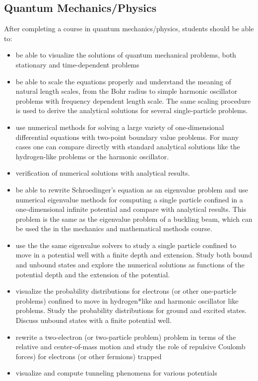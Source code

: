 \documentclass[graybox,envcountchap,sectrefs]{svmult}
\begin{document}
\subsection{Quantum Mechanics/Physics}
After completing a course in quantum mechanics/physics, students should be able to:
\begin{itemize}
\item be able to visualize the solutions of quantum mechanical problems, both stationary and time-dependent problems

\item be able to scale the equations properly and understand the meaning of natural length scales, from the Bohr radius to simple harmonic oscillator problems with frequency dependent length scale. The same scaling procedure is  used to derive the analytical solutions for several single-particle problems.

\item use numerical methods for solving a large variety of one-dimensional differential equations with two-point boundary value problems. For many cases one can compare directly with standard analytical  solutions like the hydrogen-like problems or the harmonic oscillator.

\item verification of numerical solutions with analytical results.

\item be able to rewrite Schroedinger's equation as an eigenvalue problem and use numerical eigenvalue methods for computing  a single particle confined in a one-dimensional infinite potential and compare with analytical results. This problem is the same as the eigenvalue problem of a buckling beam, which can be used the in the mechanics and mathematical methods course.

\item use the the same eigenvalue solvers to study a single particle confined to move in a potential well with a finite depth and extension. Study both bound and unbound states and explore the numerical solutions as functions of the potential depth and the extension of the potential.

\item visualize the probability distributions for electrons (or other one-particle problems) confined to move in hydrogen*like and harmonic oscillator like problems. Study the probability distributions for ground and excited states. Discuss unbound states with a finite potential well.


\item rewrite a two-electron (or two-particle problem) problem in terms of the relative and center-of-mass motion and study the role of repulsive Coulomb forces) for electrons (or other fermions) trapped

\item visualize and compute tunneling phenomena for various potentials

\end{itemize}
\end{document}
